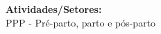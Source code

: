 {\fontsize{10pt}{12pt}\selectfont
\noindent
\textbf{Atividades/Setores:}\\
PPP - Pré-parto, parto e pós-parto
}